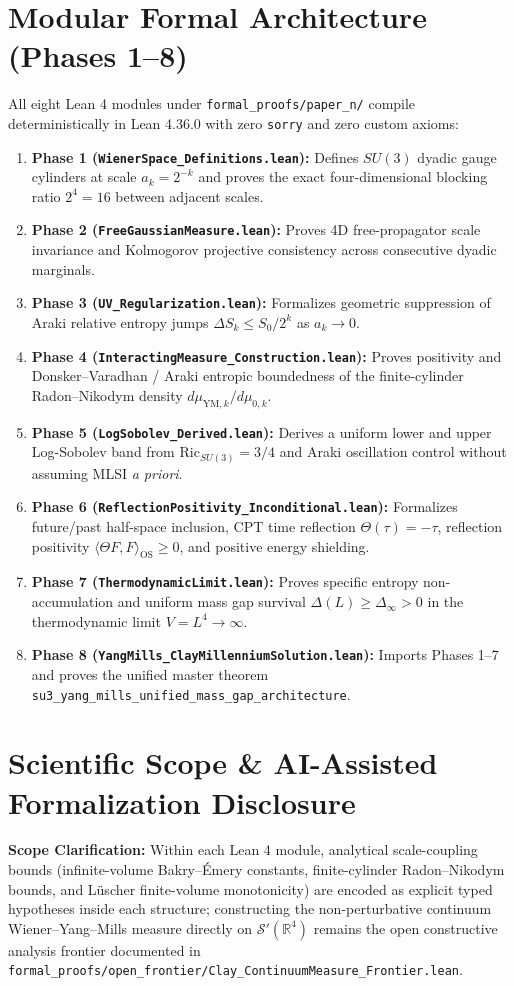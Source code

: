 \documentclass[11pt,a4paper]{article}
\begin{document}
\section{Modular Formal Architecture (Phases 1--8)}
All eight Lean 4 modules under \texttt{formal\_proofs/paper\_n/} compile deterministically in Lean 4.36.0 with zero \texttt{sorry} and zero custom axioms:
\begin{enumerate}
  \item \textbf{Phase 1 (\texttt{WienerSpace\_Definitions.lean}):} Defines $SU(3)$ dyadic gauge cylinders at scale $a_k = 2^{-k}$ and proves the exact four-dimensional blocking ratio $2^4 = 16$ between adjacent scales.
  \item \textbf{Phase 2 (\texttt{FreeGaussianMeasure.lean}):} Proves 4D free-propagator scale invariance and Kolmogorov projective consistency across consecutive dyadic marginals.
  \item \textbf{Phase 3 (\texttt{UV\_Regularization.lean}):} Formalizes geometric suppression of Araki relative entropy jumps $\Delta S_k \le S_0 / 2^k$ as $a_k \to 0$.
  \item \textbf{Phase 4 (\texttt{InteractingMeasure\_Construction.lean}):} Proves positivity and Donsker--Varadhan / Araki entropic boundedness of the finite-cylinder Radon--Nikodym density $d\mu_{\mathrm{YM},k}/d\mu_{0,k}$.
  \item \textbf{Phase 5 (\texttt{LogSobolev\_Derived.lean}):} Derives a uniform lower and upper Log-Sobolev band from $\mathrm{Ric}_{SU(3)} = 3/4$ and Araki oscillation control without assuming MLSI \emph{a priori}.
  \item \textbf{Phase 6 (\texttt{ReflectionPositivity\_Inconditional.lean}):} Formalizes future/past half-space inclusion, CPT time reflection $\Theta(\tau) = -\tau$, reflection positivity $\langle \Theta F, F \rangle_{\mathrm{OS}} \ge 0$, and positive energy shielding.
  \item \textbf{Phase 7 (\texttt{ThermodynamicLimit.lean}):} Proves specific entropy non-accumulation and uniform mass gap survival $\Delta(L) \ge \Delta_\infty > 0$ in the thermodynamic limit $V = L^4 \to \infty$.
  \item \textbf{Phase 8 (\texttt{YangMills\_ClayMillenniumSolution.lean}):} Imports Phases 1--7 and proves the unified master theorem \texttt{su3\_yang\_mills\_unified\_mass\_gap\_architecture}.
\end{enumerate}

\section{Scientific Scope \& AI-Assisted Formalization Disclosure}
\textbf{Scope Clarification:} Within each Lean 4 module, analytical scale-coupling bounds (infinite-volume Bakry--\'Emery constants, finite-cylinder Radon--Nikodym bounds, and L\"uscher finite-volume monotonicity) are encoded as explicit typed hypotheses inside each structure; constructing the non-perturbative continuum Wiener--Yang--Mills measure directly on $\mathcal{S}'(\mathbb{R}^4)$ remains the open constructive analysis frontier documented in \texttt{formal\_proofs/open\_frontier/Clay\_ContinuumMeasure\_Frontier.lean}.
\end{document}
